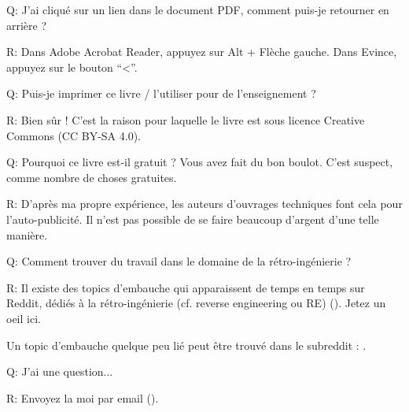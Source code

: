 \par Q: J'ai cliqué sur un lien dans le document PDF, comment puis-je retourner en arrière ?
\par R: Dans Adobe Acrobat Reader, appuyez sur Alt + Flèche gauche. Dans Evince, appuyez sur le bouton ``<''.

\par Q: Puis-je imprimer ce livre / l'utiliser pour de l'enseignement ?
\par R: Bien sûr ! C'est la raison pour laquelle le livre est sous licence Creative Commons (CC BY-SA 4.0).

\par Q: Pourquoi ce livre est-il gratuit ? Vous avez fait du bon boulot. C'est suspect, comme nombre de choses gratuites.
\par R: D'après ma propre expérience, les auteurs d'ouvrages techniques font cela pour l'auto-publicité. Il n'est pas possible de se faire beaucoup d'argent d'une telle manière.

\par Q: Comment trouver du travail dans le domaine de la rétro-ingénierie ?
\par R: Il existe des topics d'embauche qui apparaissent de temps en temps sur Reddit, dédiés à la rétro-ingénierie (cf. reverse engineering ou RE)\FNURLREDDIT{}
(\RedditHiringThread{}).
Jetez un oeil ici.

Un topic d'embauche quelque peu lié peut être trouvé dans le subreddit : \NetsecHiringThread{}.


\par Q: J'ai une question...
\par R: Envoyez la moi par email (\EMAIL).

